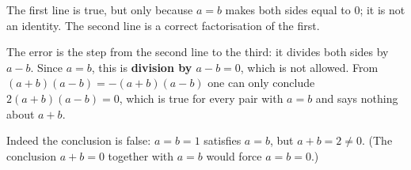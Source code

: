 The first line is true, but only because $a=b$ makes both sides equal to $0$; it is not an identity. The second line is a correct factorisation of the first.

The error is the step from the second line to the third: it divides both sides by $a-b$. Since $a=b$, this is \textbf{division by $a-b=0$}, which is not allowed. From $(a+b)(a-b)=-(a+b)(a-b)$ one can only conclude $2(a+b)(a-b)=0$, which is true for every pair with $a=b$ and says nothing about $a+b$.

Indeed the conclusion is false: $a=b=1$ satisfies $a=b$, but $a+b=2\ne0$. (The conclusion $a+b=0$ together with $a=b$ would force $a=b=0$.)
